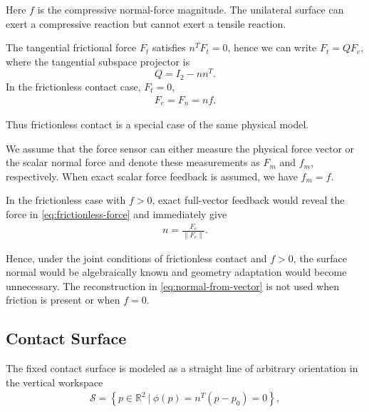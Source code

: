 \documentclass[10pt,journal,letterpaper]{IEEEtran}
\begin{document}
Here $f$ is the compressive normal-force magnitude. The unilateral surface can exert a compressive reaction but cannot exert a tensile reaction.

The tangential frictional force $F_{t}$ satisfies $n^{T}F_{t}=0$, hence we can write $F_{t}=QF_{e}$, where the tangential subspace projector is
\begin{equation}\label{eq:tangent-projector}
Q=I_2-nn^T.
\end{equation}
In the frictionless contact case, $F_{t}=0$,
\begin{equation}\label{eq:frictionless-force}
\begin{aligned}
F_{e}=F_{n}=nf.
\end{aligned}
\end{equation}

Thus frictionless contact is a special case of the same physical model.

We assume that the force sensor can either measure the physical force vector or the scalar normal force and denote these measurements as $F_{m}$ and $f_{m}$, respectively. When exact scalar force feedback is assumed, we have $f_{m}=f$.

In the frictionless case with $f>0$, exact full-vector feedback would reveal the force in \eqref{eq:frictionless-force} and immediately give
\begin{equation}\label{eq:normal-from-vector}
\begin{aligned}
n=\frac{F_{e}}{\|F_{e}\|}.
\end{aligned}
\end{equation}

Hence, under the joint conditions of frictionless contact and $f>0$, the surface normal would be algebraically known and geometry adaptation would become unnecessary. The reconstruction in \eqref{eq:normal-from-vector} is not used when friction is present or when $f=0$.

\subsection{Contact Surface}

The fixed contact surface is modeled as a straight line of arbitrary orientation in the vertical workspace
\begin{equation}\label{eq:contact-surface}
\begin{aligned}
\mathcal{S} =
\left\{
p\in\mathbb{R}^{2} \ |\ \phi(p)=n^{T}(p-p_{0})=0
\right\},
\end{aligned}
\end{equation}
\end{document}
